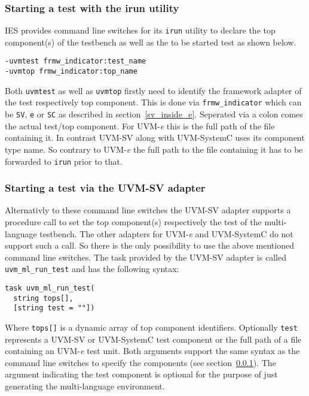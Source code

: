 \subsubsection{Starting a test with the irun utility} \label{uvm_top}
IES provides command line switches for its \lstinline$irun$ utility to declare the top component(s) of the testbench as
well as the to be started test as shown below.
\medskip
{}
\begin{lstlisting}
-uvmtest frmw_indicator:test_name
-uvmtop frmw_indicator:top_name
\end{lstlisting} 
\medskip
Both \lstinline$uvmtest$ as well as \lstinline$uvmtop$ firstly need to identify the framework adapter of the test
respectively top component. This is done via \lstinline$frmw_indicator$ which can be \lstinline$SV$, \lstinline$e$ or
\lstinline$SC$ as described in section~\ref{sv_inside_e}. Seperated via a colon comes the actual test/top component. For
UVM-\textit{e} this is the full path of the file containing it. In contrast UVM-SV along with UVM-SystemC uses
its component type name. So contrary to UVM-\textit{e} the full path to the file containing it has to be forwarded to
\lstinline$irun$ prior to that.

\subsubsection{Starting a test via the UVM-SV adapter}

Alternativly to these command line switches the UVM-SV adapter supports a procedure call to set the top
component(s) respectively the test of the multi-language testbench. The other adapters for UVM-\textit{e} and
UVM-SystemC do not support such a call. So there is the only possibility to use the above mentioned command line
switches. The task provided by the UVM-SV adapter is called \lstinline$uvm_ml_run_test$ and has the following
syntax:
\medskip
{}
\begin{lstlisting}
task uvm_ml_run_test(
  string tops[],
  [string test = ""])
\end{lstlisting} 
\medskip
Where \lstinline$tops[]$ is a dynamic array of top component identifiers. Optionally \lstinline$test$ represents a
UVM-SV or UVM-SystemC test component or the full path of a file containing an UVM-\textit{e} test unit. Both arguments
support the same syntax as the command line switches to specify the components (see section~\ref{uvm_top}). The argument
indicating the test component is optional for the purpose of just generating the multi-language environment.